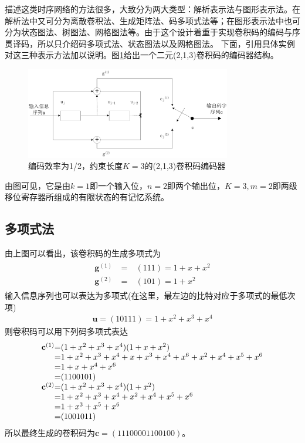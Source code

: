 描述这类时序网络的方法很多，大致分为两大类型：解析表示法与图形表示法。在解析法中又可分为离散卷积法、生成矩阵法、码多项式法等；在图形表示法中也可分为状态图法、树图法、网格图法等。由于这个设计着重于实现卷积码的编码与序贯译码，所以只介绍码多项式法、状态图法以及网格图法。
下面，引用具体实例对这三种表示方法加以说明。图\ref{fig:3.2}给出一个二元(2,1,3)卷积码的编码器结构。
\begin{figure}[htb]
  \begin{center}
    \includegraphics[width=0.8\textwidth]{images/conv2.pdf}
  \end{center}
  \caption{编码效率为1/2，约束长度$K=3$的(2,1,3)卷积码编码器}
  \label{fig:3.2}
\end{figure}
由图可见，它是由$k=1$即一个输入位，$n=2$即两个输出位，$K=3,m=2$即两级移位寄存器所组成的有限状态的有记忆系统。
\subsection{多项式法}
由上图可以看出，该卷积码的生成多项式为
\begin{eqnarray}
  \begin{array}{lll}
    \mathbf{g}^{(1)}~&=&~(111)=1+x+x^2 \\
    \mathbf{g}^{(2)}~&=&~(101)=1+x^2
\end{array}
  \label{equ:3.1}
\end{eqnarray}
输入信息序列也可以表达为多项式(在这里，最左边的比特对应于多项式的最低次项)
\begin{eqnarray}
  \mathbf{u}=(10111)=1+x^2+x^3+x^4
  \label{equ:3.2}
\end{eqnarray}
则卷积码可以用下列码多项式表达
\begin{eqnarray}
  \begin{array}{l@{\mbox{=}}l}
  
    \mathbf{c}^{(1)}&(1+x^2+x^3+x^4)(1+x+x^2)\\
    &1+x^2+x^3+x^4+x+x^3+x^4+x^6+x^2+x^4+x^5+x^6\\
    &1+x+x^4+x^6\\
    &(1100101)\\
    \mathbf{c}^{(2)}&(1+x^2+x^3+x^4)(1+x^2)\\
    &1+x^2+x^3+x^4+x^2+x^4+x^5+x^6\\
    &1+x^3+x^5+x^6\\
    &(1001011)\\
 \end{array}
  \label{equ:3.3}
\end{eqnarray}
所以最终生成的卷积码为$\mathbf{c}=(11100001100100)$。
